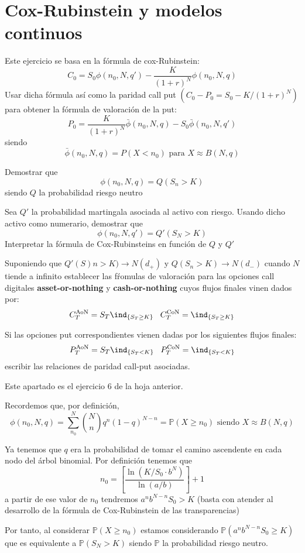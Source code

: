 \section{Cox-Rubinstein y modelos continuos}
\begin{problem}[1]
Este ejercicio se basa en la fórmula de cox-Rubinstein:
\[C_0 = S_0 \phi(n_0, N,q') - \frac{K}{(1+r)^N}\phi(n_0,N,q)\]
\ppart Usar dicha fórmula así como la paridad call put $(C_0-P_0=S_0-K/(1+r)^N)$ para obtener la fórmula de valoración de la put:
\[P_0=\frac{K}{(1+r)^N}\bar{\phi}(n_0,N,q)-S_0\bar{\phi}(n_0,N,q')\]
siendo
\[\bar{\phi}(n_0,N,q)=P(X<n_0) \text{ para } X \approx B(N,q)\]

\ppart Demostrar que
\[\phi(n_0,N,q)=Q(S_n>K)\]
siendo $Q$ la probabilidad riesgo neutro

\ppart Sea $Q'$ la probabilidad martingala asociada al activo con riesgo. Usando dicho activo como numerario, demostrar que
\[\phi(n_0,N,q') = Q'(S_N>K)\]
Interpretar la fórmula de Cox-Rubinsteins en función de $Q$ y $Q'$

\ppart Suponiendo que $Q'(S)n>K)\to N(d_+)$ y $Q(S_n>K)\to N(d_-)$ cuando $N$ tiende a infinito establecer las fŕomulas de valoración para las opciones call digitales \textbf{asset-or-nothing} y \textbf{cash-or-nothing} cuyos flujos finales vinen dados por:
\[C_T^{\text{AoN}}=S_T\ind_{\{S_T\geq K\}}\;\;\; C_T^{\text{CoN}}=\ind_{\{S_T\geq K\}}\]

\ppart Si las opciones put correspondientes vienen dadas por los siguientes flujos finales:
\[P_T^{\text{AoN}}=S_T\ind_{\{S_T< K\}}\;\;\; P_T^{\text{CoN}}=\ind_{\{S_T<K\}}\]
escribir las relaciones de paridad call-put asociadas.
\solution


\spart

Este apartado es el ejercicio 6 de la hoja anterior.

\spart

Recordemos que, por definición,
\[\phi(n_0,N,q) = \sum_{n_0}^N{N \choose n} q^n(1-q)^{N-n} = \mathbb{P}(X\geq n_0) \text{ siendo } X\approx B(N,q)\]

Ya tenemos que $q$ era la probabilidad de tomar el camino ascendente en cada nodo del árbol binomial. Por definición tenemos que
\[n_0 = \left[\frac{\ln (K/S_0\cdot b^N)}{\ln(a/b)} \right] +1\]
a partir de ese valor de $n_0$ tendremos $a^nb^{N-n}S_0 > K$ (basta con atender al desarrollo de la fórmula de Cox-Rubinstein de las transparencias)

Por tanto, al considerar $\mathbb{P}(X\geq n_0)$ estamos considerando $\mathbb{P}(a^nb^{N-n}S_0\geq K)$ que es equivalente a $\mathbb{P}(S_N>K)$ siendo $\mathbb{P}$ la probabilidad riesgo neutro.


\end{problem}
